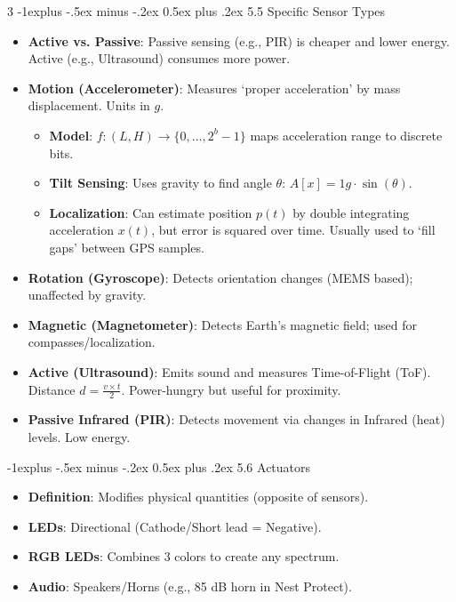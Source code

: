 \documentclass[a4paper, 9pt, landscape]{extarticle}
\makeatletter
\renewcommand{\subsection}{\@startsection{subsection}{2}{0mm}%
                                {-1explus -.5ex minus -.2ex}%
                                {0.5ex plus .2ex}%
                                {\normalfont\normalsize\bfseries}}
\makeatother
\begin{document}
\begin{multicols*}{3}
\subsection{5.5 Specific Sensor Types}
\begin{itemize}
  \item \textbf{Active vs. Passive}: Passive sensing (e.g., PIR) is cheaper and lower energy. Active (e.g., Ultrasound) consumes more power.
  \item \textbf{Motion (Accelerometer)}: Measures `proper acceleration' by mass displacement. Units in $g$.
  \begin{itemize}
    \item \textbf{Model}: $f: (L, H) \to \{0, \dots, 2^b - 1\}$ maps acceleration range to discrete bits.
    \item \textbf{Tilt Sensing}: Uses gravity to find angle $\theta$: $A[x] = 1g \cdot \sin(\theta)$.
    \item \textbf{Localization}: Can estimate position $p(t)$ by double integrating acceleration $x(t)$, but error is squared over time. Usually used to `fill gaps' between GPS samples.
  \end{itemize}
  \item \textbf{Rotation (Gyroscope)}: Detects orientation changes (MEMS based); unaffected by gravity.
  \item \textbf{Magnetic (Magnetometer)}: Detects Earth's magnetic field; used for compasses/localization.
  \item \textbf{Active (Ultrasound)}: Emits sound and measures Time-of-Flight (ToF). Distance $d = \frac{v \times t}{2}$. Power-hungry but useful for proximity.
  \item \textbf{Passive Infrared (PIR)}: Detects movement via changes in Infrared (heat) levels. Low energy.
\end{itemize}

\subsection{5.6 Actuators}
\begin{itemize}
  \item \textbf{Definition}: Modifies physical quantities (opposite of sensors).
  \item \textbf{LEDs}: Directional (Cathode/Short lead = Negative). 
  \item \textbf{RGB LEDs}: Combines 3 colors to create any spectrum.
  \item \textbf{Audio}: Speakers/Horns (e.g., 85 dB horn in Nest Protect).
\end{itemize}


\end{multicols*}
\end{document}
